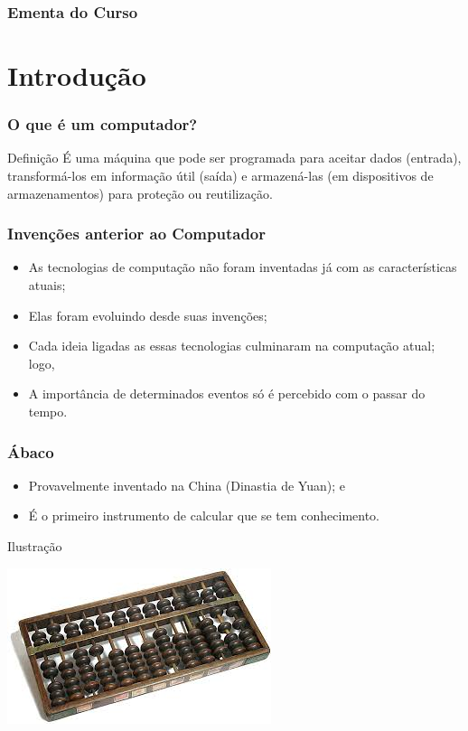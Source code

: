 \documentclass[aspectratio=169]{beamer} %
\begin{document}
\begin{frame}
	\frametitle{Ementa do Curso}
  	\tableofcontents
\end{frame}


\section{Introdução}

\begin{frame}
	\frametitle{O que é um computador?}
	
	\begin{block}{Defini\c cão}
	  É uma máquina que pode ser programada para aceitar dados (entrada), transformá-los em informa\c cão útil (saída) e armazená-las (em dispositivos de armazenamentos) para prote\c cão ou reutiliza\c cão.
	\end{block}
\end{frame}

\begin{frame}
	\frametitle{Inven\c cões anterior ao Computador}
	
	\begin{itemize}
		\item As tecnologias de computa\c cão não foram inventadas já com as características atuais;
		\item Elas foram evoluindo desde suas inven\c cões;
		\item Cada ideia ligadas as essas tecnologias culminaram na computa\c cão atual; logo,
		\item A importância de determinados eventos só é percebido com o passar do tempo.
	\end{itemize}
\end{frame}

\begin{frame}
	\frametitle{Ábaco}
	
	\begin{itemize}
		\item Provavelmente inventado na China (Dinastia de Yuan); e
		\item É o primeiro instrumento de calcular que se tem conhecimento.
	\end{itemize}\vfill
	
	\begin{exampleblock}{Ilustra\c cão}
		\begin{center}
			\includegraphics[scale=0.5]{img/abaco}
		\end{center}
	\end{exampleblock}
\end{frame}
\end{document}
